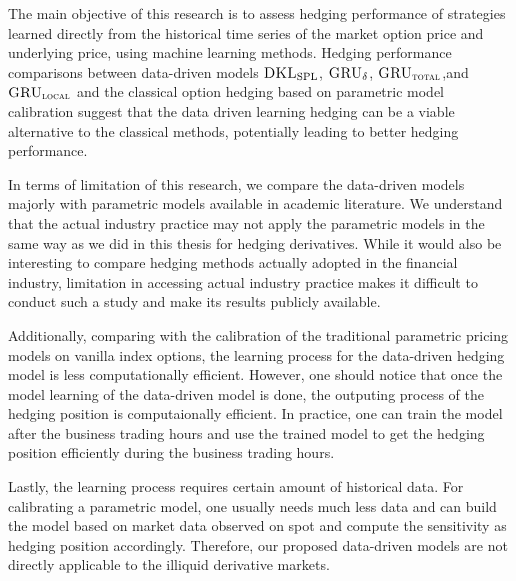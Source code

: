 \documentclass[letterpaper,12pt,titlepage,oneside,final]{book}
\numberwithin{equation}{section}
\theoremstyle{definition}
\newcommand{\model}{\textsc{GRU}_\delta}
\newcommand{\modelT}{\textsc{GRU}_{\textsc{total}}}
\newcommand{\modelL}{\textsc{GRU}_{\textsc{local}}}
\newcommand{\DKLs}{\bf\textsc{DKL}_{\text{SPL}}}
\begin{document}
The main objective of this research  is to assess hedging performance of strategies learned  directly from the  historical time series of the market option price and underlying price,  using machine learning methods. Hedging  performance comparisons between data-driven  models $\DKLs$, $\model$, $\modelT$,and  $\modelL$ and the  classical  option hedging based on parametric model calibration suggest that the data driven  learning hedging can be a viable alternative to the classical methods,  potentially leading to better hedging performance.  

In terms of limitation of this research, we compare the data-driven models majorly with parametric models available in academic literature.  We understand that the actual industry practice may not apply the parametric models in the same way as we did in this thesis for hedging derivatives.
While it would also  be interesting to compare hedging methods actually adopted in the financial industry,   limitation in accessing actual industry practice makes it difficult to conduct such a study and make its results publicly available.

Additionally, comparing with the calibration of the traditional parametric pricing models on vanilla index options, the learning process for the data-driven hedging model is less computationally efficient. However, one should notice that once the model learning of the data-driven model is done, the outputing process of the hedging position is computaionally efficient. In practice, one can train the model after the business trading hours and use  the trained model to get the hedging position efficiently  during the business trading hours.

Lastly, the learning process requires certain amount of historical data. For calibrating a parametric model, one usually needs much less data and  can  build the model based on market data observed on spot and compute the sensitivity as hedging position accordingly.  Therefore, our proposed data-driven models are not directly applicable to the illiquid derivative markets.  
\end{document}
